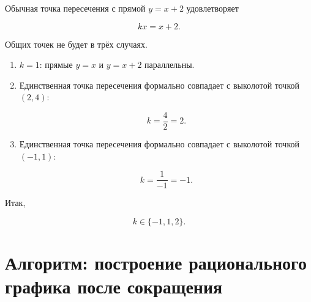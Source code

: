 \documentclass[a4paper,12pt]{article}
\begin{document}
Обычная точка пересечения с прямой $y=x+2$ удовлетворяет

\[
kx=x+2.
\]

Общих точек не будет в трёх случаях.

\begin{enumerate}
    \item
    $k=1$:
    прямые $y=x$ и $y=x+2$ параллельны.

    \item
    Единственная точка пересечения
    формально совпадает с выколотой точкой $(2,4)$:

    \[
    k=\frac42=2.
    \]

    \item
    Единственная точка пересечения
    формально совпадает с выколотой точкой $(-1,1)$:

    \[
    k=\frac{1}{-1}=-1.
    \]
\end{enumerate}

Итак,

\[
\boxed{
k\in\{-1,1,2\}
}.
\]


\clearpage

\section*{Алгоритм: построение рационального графика после сокращения}

\vspace{8mm}
\end{document}
